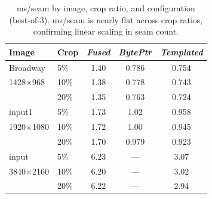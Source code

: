 \begin{table}[h!]
\caption{ms/seam by image, crop ratio, and configuration (best-of-3).
ms/seam is nearly flat across crop ratios, confirming linear scaling in seam count.}
\label{tab:sweep}
\centering
\begin{tabular}{@{}llccc@{}}
\toprule
\textbf{Image} & \textbf{Crop} & \textbf{\emph{Fused}} & \textbf{\emph{BytePtr}} & \textbf{\emph{Templated}} \\
\midrule
Broadway          & 5\%  & 1.40 & 0.786 & 0.754 \\
1428$\times$968   & 10\% & 1.38 & 0.778 & 0.743 \\
                  & 20\% & 1.35 & 0.763 & 0.724 \\
\midrule
input1            & 5\%  & 1.73 & 1.02  & 0.958 \\
1920$\times$1080  & 10\% & 1.72 & 1.00  & 0.945 \\
                  & 20\% & 1.70 & 0.979 & 0.923 \\
\midrule
input             & 5\%  & 6.23 & ---   & 3.07  \\
3840$\times$2160  & 10\% & 6.20 & ---   & 3.02  \\
                  & 20\% & 6.22 & ---   & 2.94  \\
\bottomrule
\end{tabular}
\end{table}
